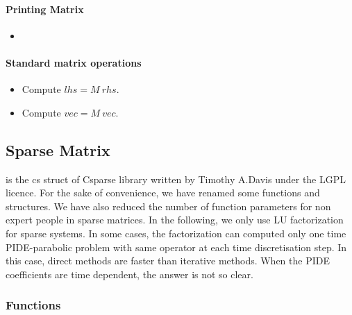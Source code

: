 \paragraph{Printing Matrix}
\begin{itemize}
\item {}
\end{itemize}

\paragraph{Standard matrix operations}
\begin{itemize}
\item {}
  \sshortdescribe Compute $ lhs=M \ rhs$.
\item {}
  \sshortdescribe Compute $ vec=M \ vec$.
\end{itemize}


\subsection{Sparse Matrix}

 is the cs struct of Csparse library written by
Timothy A.Davis under the LGPL licence.  For the sake of convenience, we have
renamed some functions and structures. We have also reduced the number of
function parameters for non expert people in sparse matrices.  In the following, 
we only use LU factorization for sparse systems. In some cases, the factorization
can computed only one time PIDE-parabolic problem with same operator at each
time discretisation step. In this case, direct methods are faster than
iterative methods. When the PIDE coefficients are time dependent, the answer is not
so clear.

\subsubsection{Functions}
